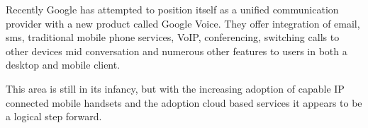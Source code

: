 Recently Google has attempted to position itself as a unified communication provider with a new product called Google Voice. They offer integration of email, sms, traditional mobile phone services, VoIP, conferencing, switching calls to other devices mid conversation and numerous other features to users in both a desktop and mobile client.\cite{website:cellularNewsGoogleUC}

This area is still in its infancy, but with the increasing adoption of capable IP connected mobile handsets and the adoption cloud based services it appears to be a logical step forward.


